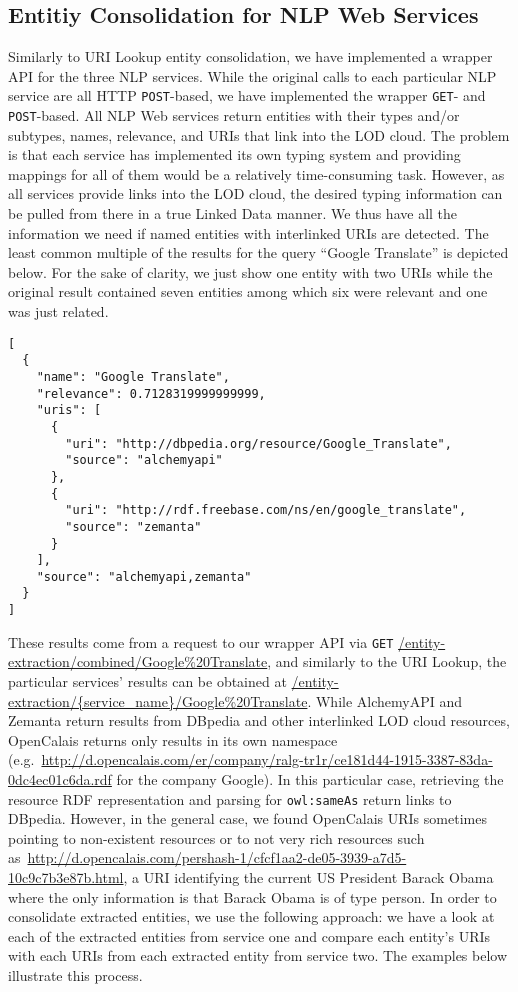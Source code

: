 \documentclass{acm_proc_article-sp}
\newcommand{\nofootnote}[1]{~#1}
\begin{document}
\subsection{Entitiy Consolidation for NLP Web Services}                     \label{sec:consolidation-nlp}
Similarly to URI Lookup entity consolidation, we have implemented a wrapper API for the three NLP services. While the
original calls to each particular NLP service are all HTTP \texttt{POST}-based, we have implemented the wrapper
\texttt{GET}- and \texttt{POST}-based. All NLP Web services return entities with their types and/or subtypes, names,
relevance, and URIs that link into the LOD cloud. The problem is that each service has implemented its own typing
system and providing mappings for all of them would be a relatively time-consuming task. However, as all services
provide links into the LOD cloud, the desired typing information can be pulled from there in a true Linked Data manner.
We thus have all the information we need if named entities with interlinked URIs are detected. The least common
multiple of the results for the query ``Google Translate'' is depicted below. For the sake of clarity, we just show one
entity with two URIs while the original result contained seven entities among which six were relevant and one was just
related.
\begin{lstlisting}
[
  {
    "name": "Google Translate",
    "relevance": 0.7128319999999999,
    "uris": [
      {
        "uri": "http://dbpedia.org/resource/Google_Translate",
        "source": "alchemyapi"
      },
      {
        "uri": "http://rdf.freebase.com/ns/en/google_translate",
        "source": "zemanta"
      }
    ],
    "source": "alchemyapi,zemanta"
  }
]
\end{lstlisting}

These results come from a request to our wrapper API via \texttt{GET} \url{/entity-extraction/combined/Google%20Translate},
and similarly to the URI Lookup, the particular services' results can be obtained at \url{/entity-extraction/{service_name}/Google%
While AlchemyAPI and Zemanta return results from DBpedia and other interlinked LOD cloud resources, OpenCalais returns
only results in its own namespace
(e.g.\nofootnote{\url{http://d.opencalais.com/er/company/ralg-tr1r/ce181d44-1915-3387-83da-0dc4ec01c6da.rdf}} for the
company Google). In this particular case, retrieving the resource RDF representation and parsing for
\texttt{owl:sameAs} return links to DBpedia. However, in the general case, we found OpenCalais URIs sometimes pointing
to non-existent resources or to not very rich resources such
as\nofootnote{\url{http://d.opencalais.com/pershash-1/cfcf1aa2-de05-3939-a7d5-10c9c7b3e87b.html}}, a URI identifying
the current US President Barack Obama where the only information is that Barack Obama is of type person. In order to
consolidate extracted entities, we use the following approach: we have a look at each of the extracted entities from
service one and compare each entity's URIs with each URIs from each extracted entity from service two. The examples
below illustrate this process.
\end{document}
